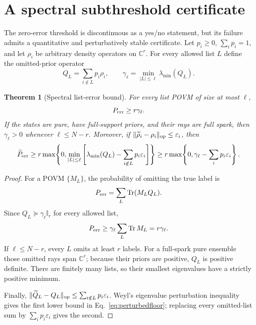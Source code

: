 \documentclass[11pt,a4paper]{article}
\newtheorem{theorem}{Theorem}[section]
\newcommand{\C}{\mathbb{C}}
\newcommand{\I}{\mathbb{I}}
\newcommand{\Tr}{\operatorname{Tr}}
\begin{document}
\section{A spectral subthreshold certificate}\label{sec:robust}

The zero-error threshold is discontinuous as a yes/no statement, but its
failure admits a quantitative and perturbatively stable certificate.  Let
$p_i\ge0$, $\sum_i p_i=1$, and let $\rho_i$ be arbitrary density operators on
$\C^r$.  For every allowed list $L$ define the omitted-prior operator
\[
 Q_L=\sum_{i\notin L}p_i\rho_i,
 \qquad
 \gamma_\ell=\min_{|L|\le\ell}\lambda_{\min}(Q_L).
\]

\begin{theorem}[Spectral list-error bound]\label{thm:robustfloor}
For every list POVM of size at most $\ell$,
\begin{equation}\label{eq:robustfloor}
 P_{\rm err}\ge r\gamma_\ell.
\end{equation}
If the states are pure, have full-support priors, and their rays are full
spark, then $\gamma_\ell>0$ whenever $\ell\le N-r$.
Moreover, if $\|\widetilde\rho_i-\rho_i\|_{\rm op}\le\varepsilon_i$, then
\begin{equation}\label{eq:perturbedfloor}
 \widetilde P_{\rm err}
 \ge r\max\!\left\{0,
 \min_{|L|\le\ell}\left[
 \lambda_{\min}(Q_L)-\sum_{i\notin L}p_i\varepsilon_i
 \right]\right\}
 \ge r\max\!\left\{0,
 \gamma_\ell-\sum_i p_i\varepsilon_i\right\}.
\end{equation}
\end{theorem}

\begin{proof}
For a POVM $\{M_L\}$, the probability of omitting the true label is
\[
 P_{\rm err}=\sum_L\Tr(M_LQ_L).
\]
Since $Q_L\succeq\gamma_\ell\I_r$ for every allowed list,
\[
 P_{\rm err}\ge\gamma_\ell\sum_L\Tr M_L
 =r\gamma_\ell.
\]
If $\ell\le N-r$, every $L$ omits at least $r$ labels.  For a full-spark pure
ensemble those omitted rays span $\C^r$; because their priors are positive,
$Q_L$ is positive definite.  There are finitely many lists, so their smallest
eigenvalues have a strictly positive minimum.

Finally,
$\|\widetilde Q_L-Q_L\|_{\rm op}
\le\sum_{i\notin L}p_i\varepsilon_i$.
Weyl's eigenvalue perturbation inequality gives the first lower bound in
Eq.~\eqref{eq:perturbedfloor}; replacing every omitted-list sum by
$\sum_i p_i\varepsilon_i$ gives the second.
\end{proof}
\end{document}
